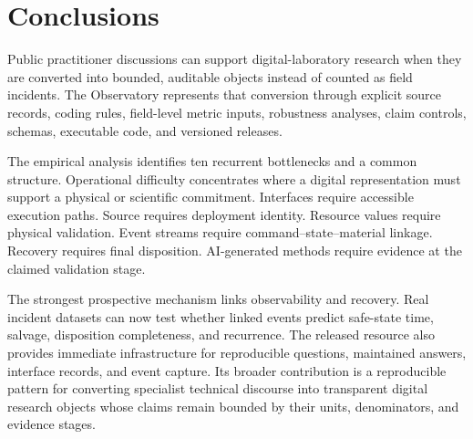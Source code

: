 \section{Conclusions}
\label{sec:conclusion}

Public practitioner discussions can support digital-laboratory research when they are converted into bounded, auditable objects instead of counted as field incidents. The Observatory represents that conversion through explicit source records, coding rules, field-level metric inputs, robustness analyses, claim controls, schemas, executable code, and versioned releases.

The empirical analysis identifies ten recurrent bottlenecks and a common structure. Operational difficulty concentrates where a digital representation must support a physical or scientific commitment. Interfaces require accessible execution paths. Source requires deployment identity. Resource values require physical validation. Event streams require command--state--material linkage. Recovery requires final disposition. AI-generated methods require evidence at the claimed validation stage.

The strongest prospective mechanism links observability and recovery. Real incident datasets can now test whether linked events predict safe-state time, salvage, disposition completeness, and recurrence. The released resource also provides immediate infrastructure for reproducible questions, maintained answers, interface records, and event capture. Its broader contribution is a reproducible pattern for converting specialist technical discourse into transparent digital research objects whose claims remain bounded by their units, denominators, and evidence stages.
